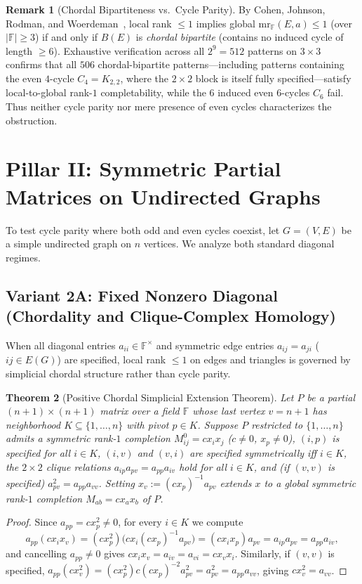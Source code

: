 \documentclass[11pt]{article}
\newtheorem{theorem}{Theorem}[section]
\theoremstyle{definition}
\newtheorem{remark}[theorem]{Remark}
\newcommand{\F}{\mathbb{F}}
\newcommand{\mr}{\mathrm{mr}}
\begin{document}
\begin{remark}[Chordal Bipartiteness vs.\ Cycle Parity]
By Cohen, Johnson, Rodman, and Woerdeman~\cite{CJRW1989}, local rank $\le 1$ implies global $\mr_{\F}(E,a)\le 1$ (over $|\F|\ge 3$) if and only if $B(E)$ is \emph{chordal bipartite} (contains no induced cycle of length $\ge 6$). Exhaustive verification across all $2^9 = 512$ patterns on $3\times 3$ confirms that all $506$ chordal-bipartite patterns---including patterns containing the even $4$-cycle $C_4 = K_{2,2}$, where the $2\times 2$ block is itself fully specified---satisfy local-to-global rank-$1$ completability, while the $6$ induced even $6$-cycles $C_6$ fail. Thus neither cycle parity nor mere presence of even cycles characterizes the obstruction.
\end{remark}

\section{Pillar II: Symmetric Partial Matrices on Undirected Graphs}

To test cycle parity where both odd and even cycles coexist, let $G = (V,E)$ be a simple undirected graph on $n$ vertices. We analyze both standard diagonal regimes.

\subsection{Variant 2A: Fixed Nonzero Diagonal (Chordality and Clique-Complex Homology)}

When all diagonal entries $a_{ii} \in \F^\times$ and symmetric edge entries $a_{ij} = a_{ji}$ ($ij \in E(G)$) are specified, local rank $\le 1$ on edges and triangles is governed by simplicial chordal structure rather than cycle parity.

\begin{theorem}[Positive Chordal Simplicial Extension Theorem]\label{thm:chordal-step}
Let $P$ be a partial $(n+1)\times(n+1)$ matrix over a field $\F$ whose last vertex $v = n+1$ has neighborhood $K \subseteq \{1,\dots,n\}$ with pivot $p \in K$. Suppose $P$ restricted to $\{1,\dots,n\}$ admits a symmetric rank-$1$ completion $M^0_{ij} = c x_i x_j$ ($c \neq 0$, $x_p \neq 0$), $(i,p)$ is specified for all $i \in K$, $(i,v)$ and $(v,i)$ are specified symmetrically iff $i \in K$, the $2\times 2$ clique relations $a_{ip} a_{pv} = a_{pp} a_{iv}$ hold for all $i\in K$, and (if $(v,v)$ is specified) $a_{pv}^2 = a_{pp} a_{vv}$. Setting $x_v := (c x_p)^{-1} a_{pv}$ extends $x$ to a global symmetric rank-$1$ completion $M_{ab} = c x_a x_b$ of $P$.
\end{theorem}
\begin{proof}
Since $a_{pp} = c x_p^2 \neq 0$, for every $i \in K$ we compute
\[
a_{pp} (c x_i x_v) = (c x_p^2)\bigl(c x_i (c x_p)^{-1} a_{pv}\bigr) = (c x_i x_p) a_{pv} = a_{ip} a_{pv} = a_{pp} a_{iv},
\]
and cancelling $a_{pp}\neq 0$ gives $c x_i x_v = a_{iv} = a_{vi} = c x_v x_i$. Similarly, if $(v,v)$ is specified, $a_{pp}(c x_v^2) = (c x_p^2) c (c x_p)^{-2} a_{pv}^2 = a_{pv}^2 = a_{pp} a_{vv}$, giving $c x_v^2 = a_{vv}$.
\end{proof}
\end{document}
